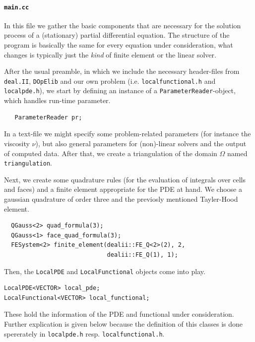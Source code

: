 \documentclass[prodmode,acmtoms]{acmsmall}
\numberwithin{equation}{section}
\newcommand{\deal}{\texttt{deal.II}}
\newcommand{\dope}{\texttt{DOpElib}}
\begin{document}
\paragraph{\texttt{main.cc}}
In this file we gather the basic components that are necessary for the solution process of a (stationary) partial differential equation. The structure of the program is basically the same for every equation under consideration, what changes is typically just the \textit{kind} of  finite element or the linear solver.  

After the usual preamble, in which we include the necessary header-files from \deal{}, \dope{} and our own problem (i.e. \texttt{localfunctional.h} and \texttt{localpde.h}), we start by defining an instance of a \texttt{ParameterReader}-object, which handles run-time parameter.
\begin{lstlisting}
   ParameterReader pr;
\end{lstlisting}
In a text-file we might specify some problem-related parameters (for instance the viscosity $\nu$), but also general parameters for (non)-linear solvers and the output of computed data. 
After that, we create a triangulation of the domain $\Omega$ named \texttt{triangulation}.

Next, we create some quadrature rules (for the evaluation of integrals over cells and faces) and a finite element appropriate for the PDE at hand. We choose a gaussian quadrature of order three and the previosly mentioned Tayler-Hood element. 
\begin{lstlisting}
  QGauss<2> quad_formula(3);
  QGauss<1> face_quad_formula(3);
  FESystem<2> finite_element(dealii::FE_Q<2>(2), 2,
                             dealii::FE_Q(1), 1);
\end{lstlisting}
Then, the \texttt{LocalPDE} and \texttt{LocalFunctional} objects come into play.
\begin{lstlisting}
LocalPDE<VECTOR> local_pde;
LocalFunctional<VECTOR> local_functional;
\end{lstlisting}
These hold the information of the PDE and functional under consideration. Further explication is given below because
the definition of this classes is done spererately in \texttt{localpde.h} resp.   \texttt{localfunctional.h}.
\end{document}
